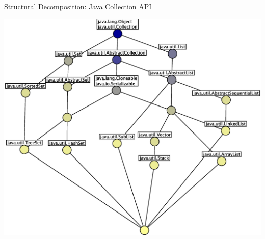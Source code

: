 \documentclass[pdf,prettybox]{prosper}
\begin{document}
\begin{slide}{Structural Decomposition: Java Collection API}
 \begin{center}
  \includegraphics[height=0.8 \textheight]{img/class-hierarchy.eps}
 \end{center}
\end{slide}
\end{document}
